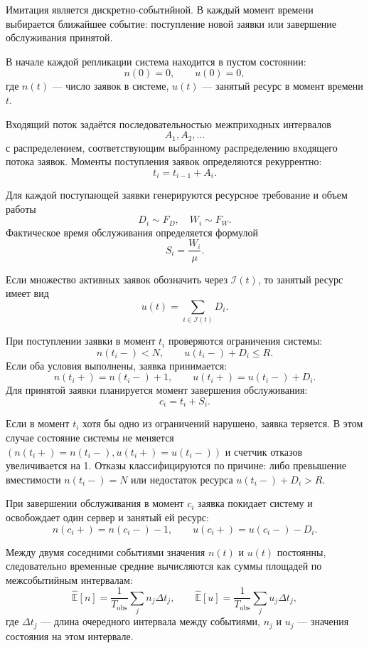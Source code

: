 Имитация является дискретно-событийной. В каждый момент времени выбирается ближайшее событие: поступление новой заявки или завершение обслуживания принятой\cite{banks2010_discrete_event_simulation,law2015_simulation_modeling}. 

В начале каждой репликации система находится в пустом состоянии:
$$
n(0)=0,\qquad u(0)=0,
$$
где $n(t)$ --- число заявок в системе, $u(t)$ --- занятый ресурс в момент времени $t$.

Входящий поток задаётся последовательностью межприходных интервалов
$$
A_1,A_2,\dots
$$
с распределением, соответствующим выбранному распределению входящего потока заявок. Моменты поступления заявок определяются рекуррентно:
$$
t_i = t_{i-1} + A_i.
$$

Для каждой поступающей заявки генерируются ресурсное требование и объем работы 
$$
D_i \sim F_D, \quad
W_i \sim F_W.
$$
Фактическое время обслуживания определяется формулой
$$
S_i = \frac{W_i}{\mu}.
$$

Если множество активных заявок обозначить через $\mathcal{I}(t)$, то занятый ресурс имеет вид
$$
u(t)=\sum_{i\in\mathcal{I}(t)}D_i.
$$

При поступлении заявки в момент $t_i$ проверяются ограничения системы:
$$
n(t_i-) < N,
\qquad
u(t_i-) + D_i \leq R.
$$
Если оба условия выполнены, заявка принимается:
$$
n(t_i+) = n(t_i-) + 1,\qquad u(t_i+) = u(t_i-) + D_i.
$$
Для принятой заявки планируется момент завершения обслуживания:
$$
c_i = t_i + S_i.
$$

Если в момент $t_i$ хотя бы одно из ограничений нарушено, заявка теряется. В этом случае состояние системы не меняется $(n(t_i​+)=n(t_i​−), u(t_i​+)=u(t_i​−))$ и счетчик отказов увеличивается на 1. Отказы классифицируются по причине: либо превышение вместимости $n(t_i-) = N$ или недостаток ресурса $u(t_i-)+D_i > R$. 

При завершении обслуживания в момент $c_i$ заявка покидает систему и освобождает один сервер и занятый ей ресурс:
$$
n(c_i+) = n(c_i-) - 1,
\qquad
u(c_i+) = u(c_i-) - D_i.
$$

Между двумя соседними событиями значения $n(t)$ и $u(t)$ постоянны, следовательно временные средние вычисляются как суммы площадей по межсобытийным интервалам:
$$
\widehat{\mathbb{E}}[n]
=
\frac{1}{T_{\mathrm{obs}}}
\sum_j n_j \Delta t_j,
\qquad
\widehat{\mathbb{E}}[u]
=
\frac{1}{T_{\mathrm{obs}}}
\sum_j u_j \Delta t_j,
$$
где $\Delta t_j$ --- длина очередного интервала между событиями, $n_j$ и $u_j$ --- значения состояния на этом интервале.

